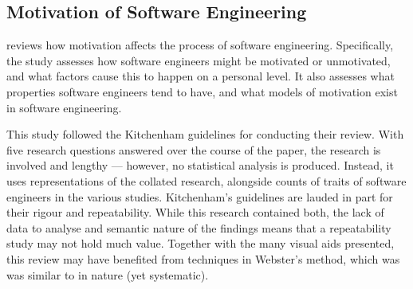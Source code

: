 \subsection{Motivation of Software Engineering} 
\citet*{Beecham2007} reviews how motivation affects the process of software engineering. Specifically, the study assesses how software engineers might be motivated or unmotivated, and what factors cause this to happen on a personal level. It also assesses what properties software engineers tend to have, and what models of motivation exist in software engineering.\par

This study followed the Kitchenham guidelines for conducting their review. With five research questions answered over the course of the paper, the research is involved and lengthy --- however, no statistical analysis is produced. Instead, it uses representations of the collated research, alongside counts of traits of software engineers in the various studies. Kitchenham's guidelines are lauded in part for their rigour and repeatability. While this research contained both, the lack of data to analyse and semantic nature of the findings means that a repeatability study may not hold much value. Together with the many visual aids presented, this review may have benefited from techniques in Webster's method, which was was similar to in nature (yet systematic).\par
